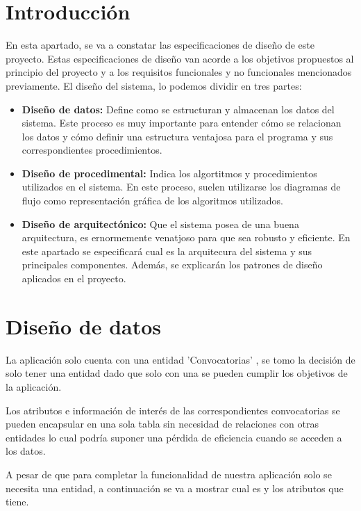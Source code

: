 
\section{Introducción}

En esta apartado, se va a constatar las especificaciones de diseño de este proyecto. Estas especificaciones de diseño van acorde a los objetivos propuestos al principio del proyecto y a los requisitos funcionales y no funcionales mencionados previamente. El diseño del sistema, lo podemos dividir en tres partes:

\begin{itemize}
    \item \textbf{Diseño de datos:} Define como se estructuran y almacenan los datos del sistema. Este proceso es muy importante para entender cómo se relacionan los datos y cómo definir una estructura ventajosa para el programa y sus correspondientes procedimientos.
    \item \textbf{Diseño de procedimental:} Indica los algortitmos y procedimientos utilizados en el sistema. En este proceso, suelen utilizarse los diagramas de flujo como representación gráfica de los algoritmos utilizados. 
    \item \textbf{Diseño de arquitectónico:} Que el sistema posea de una buena arquitectura, es ernormemente venatjoso para que sea robusto y eficiente. En este apartado se especificará cual es la arquitecura del sistema y sus principales componentes. Además, se explicarán los patrones de diseño aplicados en el proyecto.
\end{itemize}

\section{Diseño de datos}

La aplicación solo cuenta con una entidad 'Convocatorias' , se tomo la decisión de solo tener una entidad dado que solo con una se pueden cumplir los objetivos de la aplicación. 

Los atributos e información de interés de las correspondientes convocatorias se pueden encapsular en una sola tabla sin necesidad de relaciones con otras entidades lo cual podría suponer una pérdida de eficiencia cuando se acceden a los datos.

A pesar de que para completar la funcionalidad de nuestra aplicación solo se necesita una entidad, a continuación se va a mostrar cual es y los atributos que tiene.

